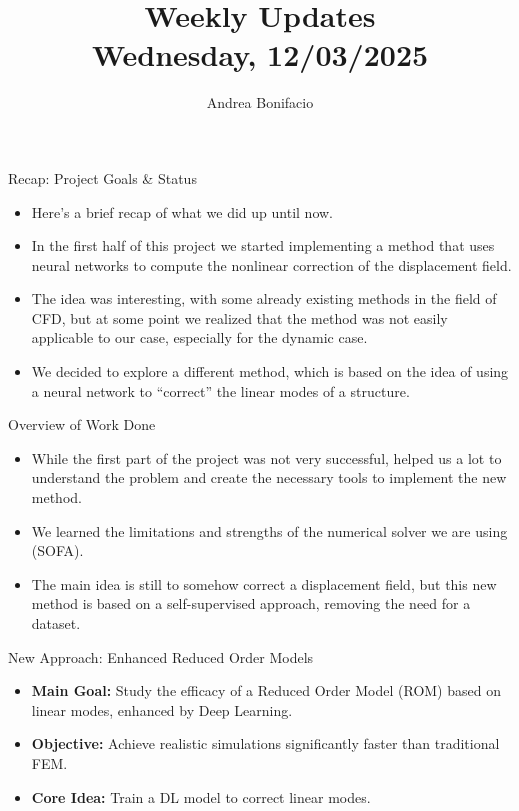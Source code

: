 \documentclass{beamer}
\title{Weekly Updates\\
\tiny{Wednesday, 12/03/2025}}
\author{Andrea Bonifacio}
\date{}
\begin{document}
\begin{frame}
\titlepage
\end{frame}

\begin{frame}{Recap: Project Goals \& Status}
    \begin{itemize}
        \item Here's a brief recap of what we did up until now.
        \item In the first half of this project we started implementing a method that uses neural networks to compute the nonlinear correction of the displacement field.
        \item The idea was interesting, with some already existing methods in the field of CFD, but at some point we realized that the method was not easily applicable to our case, especially for the dynamic case.
        \item We decided to explore a different method, which is based on the idea of using a neural network to ``correct'' the linear modes of a structure.
    \end{itemize}
\end{frame}

\begin{frame}{Overview of Work Done}
    \begin{itemize}
        \item While the first part of the project was not very successful, helped us a lot to understand the problem and create the necessary tools to implement the new method.
        \item We learned the limitations and strengths of the numerical solver we are using (SOFA).
        \item The main idea is still to somehow correct a displacement field, but this new method is based on a self-supervised approach, removing the need for a dataset.
    \end{itemize}
\end{frame}


\begin{frame}{New Approach: Enhanced Reduced Order Models}
    \begin{itemize}
        \item \textbf{Main Goal:} Study the efficacy of a Reduced Order Model (ROM) based on linear modes, enhanced by Deep Learning.
        \item \textbf{Objective:} Achieve realistic simulations significantly faster than traditional FEM.
        \item \textbf{Core Idea:} Train a DL model to correct linear modes.
    \end{itemize}
\end{frame}
\end{document}
